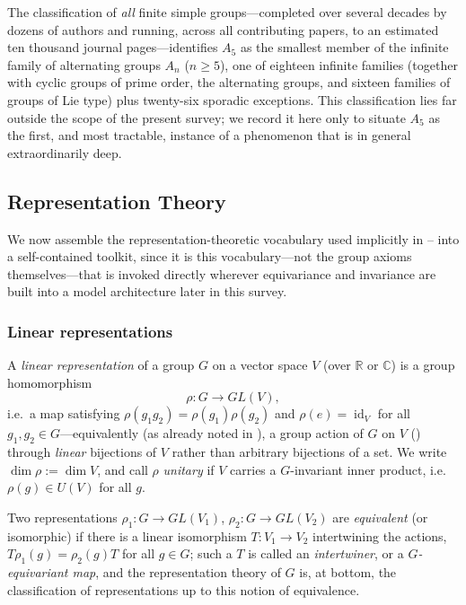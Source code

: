 \documentclass[mathematics,review,submit,moreauthors]{Definitions/mdpi}
\begin{document}
The classification of \emph{all} finite simple groups---completed over
several decades by dozens of authors and running, across all contributing
papers, to an estimated ten thousand journal pages---identifies $A_5$ as the
smallest member of the infinite family of alternating groups $A_n$
($n \geq 5$), one of eighteen infinite families (together with cyclic groups
of prime order, the alternating groups, and sixteen families of groups of
Lie type) plus twenty-six sporadic exceptions. This classification lies far
outside the scope of the present survey; we record it here only to situate
$A_5$ as the first, and most tractable, instance of a phenomenon that is in
general extraordinarily deep.

%
\subsection{Representation Theory}
\label{subsec:representation-theory}

We now assemble the representation-theoretic vocabulary used implicitly in
--
into a self-contained toolkit, since it is this vocabulary---not the group
axioms themselves---that is invoked directly wherever equivariance and
invariance are built into a model architecture later in this survey.

\subsubsection{Linear representations}
\label{subsubsec:linear-representations}

\begin{Definition}
\label{def:linear-representation}
A \emph{linear representation} of a group $G$ on a vector space $V$ (over
$\mathbb{R}$ or $\mathbb{C}$) is a group homomorphism
\[
    \rho : G \longrightarrow GL(V),
\]
i.e.\ a map satisfying $\rho(g_1 g_2) = \rho(g_1)\rho(g_2)$ and
$\rho(e) = \operatorname{id}_V$ for all $g_1, g_2 \in G$---equivalently (as already
noted in ), a group action of $G$ on $V$
() through \emph{linear} bijections of $V$
rather than arbitrary bijections of a set. We write $\dim \rho := \dim V$,
and call $\rho$ \emph{unitary} if $V$ carries a $G$-invariant inner product,
i.e.\ $\rho(g) \in U(V)$ for all $g$.
\end{Definition}

Two representations $\rho_1 : G \to GL(V_1)$, $\rho_2 : G \to GL(V_2)$ are
\emph{equivalent} (or isomorphic) if there is a linear isomorphism
$T : V_1 \to V_2$ intertwining the actions,
$T \rho_1(g) = \rho_2(g) T$ for all $g \in G$; such a $T$ is called an
\emph{intertwiner}, or a \emph{$G$-equivariant map}, and the representation
theory of $G$ is, at bottom, the classification of representations up to
this notion of equivalence.
\end{document}
